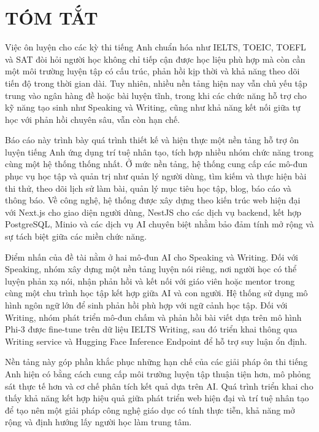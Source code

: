 \chapter*{TÓM TẮT}
Việc ôn luyện cho các kỳ thi tiếng Anh chuẩn hóa như IELTS, TOEIC, TOEFL và SAT đòi hỏi người học không chỉ tiếp cận được học liệu phù hợp mà còn cần một môi trường luyện tập có cấu trúc, phản hồi kịp thời và khả năng theo dõi tiến độ trong thời gian dài. Tuy nhiên, nhiều nền tảng hiện nay vẫn chủ yếu tập trung vào ngân hàng đề hoặc bài luyện tĩnh, trong khi các chức năng hỗ trợ cho kỹ năng tạo sinh như Speaking và Writing, cũng như khả năng kết nối giữa tự học với phản hồi chuyên sâu, vẫn còn hạn chế.

Báo cáo này trình bày quá trình thiết kế và hiện thực một nền tảng hỗ trợ ôn luyện tiếng Anh ứng dụng trí tuệ nhân tạo, tích hợp nhiều nhóm chức năng trong cùng một hệ thống thống nhất. Ở mức nền tảng, hệ thống cung cấp các mô-đun phục vụ học tập và quản trị như quản lý người dùng, tìm kiếm và thực hiện bài thi thử, theo dõi lịch sử làm bài, quản lý mục tiêu học tập, blog, báo cáo và thông báo. Về công nghệ, hệ thống được xây dựng theo kiến trúc web hiện đại với Next.js cho giao diện người dùng, NestJS cho các dịch vụ backend, kết hợp PostgreSQL, Minio và các dịch vụ AI chuyên biệt nhằm bảo đảm tính mở rộng và sự tách biệt giữa các miền chức năng.

Điểm nhấn của đề tài nằm ở hai mô-đun AI cho Speaking và Writing. Đối với Speaking, nhóm xây dựng một nền tảng luyện nói riêng, nơi người học có thể luyện phản xạ nói, nhận phản hồi và kết nối với giáo viên hoặc mentor trong cùng một chu trình học tập kết hợp giữa AI và con người. Hệ thống sử dụng mô hình ngôn ngữ lớn để sinh phản hồi phù hợp với ngữ cảnh học tập. Đối với Writing, nhóm phát triển mô-đun chấm và phản hồi bài viết dựa trên mô hình Phi-3 được fine-tune trên dữ liệu IELTS Writing, sau đó triển khai thông qua Writing service và Hugging Face Inference Endpoint để hỗ trợ suy luận ổn định.

Nền tảng này góp phần khắc phục những hạn chế của các giải pháp ôn thi tiếng Anh hiện có bằng cách cung cấp môi trường luyện tập thuận tiện hơn, mô phỏng sát thực tế hơn và cơ chế phân tích kết quả dựa trên AI. Quá trình triển khai cho thấy khả năng kết hợp hiệu quả giữa phát triển web hiện đại và trí tuệ nhân tạo để tạo nên một giải pháp công nghệ giáo dục có tính thực tiễn, khả năng mở rộng và định hướng lấy người học làm trung tâm.